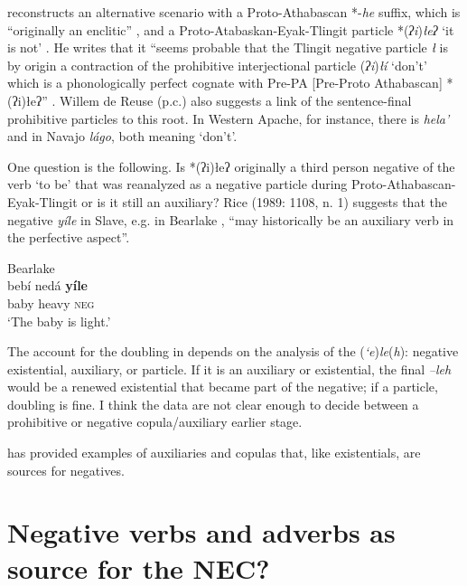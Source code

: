 ﻿\documentclass[output=paper]{langsci/langscibook}
\begin{document}
%
\citeauthor{Leer2000} reconstructs an alternative scenario with a
Proto-Athabascan *-\textit{he} suffix, which is ``originally an enclitic''
\citeyearpar[102]{Leer2000}, and a Proto-Atabaskan-Eyak-Tlingit particle
*(\textit{ʔi})\textit{łeʔ} `it is not' \citep[123]{Leer2000}. He writes that it
``seems probable that the Tlingit negative particle \textit{ł}
is by origin a contraction of the prohibitive interjectional particle
(\textit{ʔi})\textit{łí} `don't' which is a phonologically perfect cognate with
Pre-PA [Pre-Proto Athabascan] *(ʔi)łeʔ'' \citep[123--4]{Leer2000}. Willem
de Reuse (p.c.) also suggests a link of the sentence-final prohibitive
particles to this root. In Western Apache, for instance, there
is \textit{hela'} and in Navajo \textit{lágo}, both meaning `don't'.

One question is the following. Is *(ʔi)łeʔ originally a third person
negative of the verb `to be' that was reanalyzed as a negative particle
during Proto-Atha\-bas\-can-Eyak-Tlingit or is it still an auxiliary? Rice
(1989: 1108, n. 1) suggests that the negative \textit{yíle} in Slave, e.g.
in Bearlake , ``may historically be an auxiliary verb in the
perfective aspect''.
%
\begin{exe}\ex Bearlake \label{ex:other-bearlake-light}\\
    \gll bebí  nedá  \textbf{yíle}            \\
    baby  heavy  \textsc{neg} \\
    \glt `The baby is light.' \citep[1101]{Rice1989}
    \end{exe}
%
The account for the doubling in  depends on the
analysis of the (\textit{‘e})\textit{le}(\textit{h}): negative existential, auxiliary, or
particle. If it is an auxiliary or existential, the final \textit{–leh}
would be a renewed existential that became part of the negative; if a
particle, doubling is fine. I think the data are not clear enough to decide
between a prohibitive or negative copula\slash auxiliary earlier stage.

 has provided examples of auxiliaries and copulas
that, like existentials, are sources for negatives.

\section{Negative verbs and adverbs as source for the
NEC?}\label{sec:oth-3}
\end{document}
